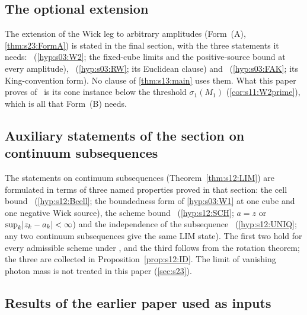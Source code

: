 \subsection{The optional extension}

The extension of the Wick leg to arbitrary amplitudes (Form~(A), \cref{thm:s23:FormA}) is stated in the final section, with the three statements it needs: \Wtwo\ (\cref{hyp:s03:W2}; the fixed-cube limits and the positive-source bound at every amplitude), \RW\ (\cref{hyp:s03:RW}; its Euclidean clause) and \FAK\ (\cref{hyp:s03:FAK}; its King-convention form). No clause of \cref{thm:s13:main} uses them. What this paper proves of \Wtwo\ is its cone instance below the threshold $\sigma_1(M_1)$ (\cref{cor:s11:W2prime}), which is all that Form~(B) needs.

\subsection{Auxiliary statements of the section on continuum subsequences}

The statements on continuum subsequences (Theorem~\ref{thm:s12:LIM}) are formulated in terms of three named properties proved in that section: the cell bound \Bcell\ (\cref{hyp:s12:Bcell}; the boundedness form of \cref{hyp:s03:W1} at one cube and one negative Wick source), the scheme bound \SCH\ (\cref{hyp:s12:SCH}; $a=z$ or $\sup_k\lvert z_k-a_k\rvert<\infty$) and the independence of the subsequence \UNIQ\ (\cref{hyp:s12:UNIQ}; any two continuum subsequences give the same LIM state). The first two hold for every admissible scheme under \Tthree, and the third follows from the rotation theorem; the three are collected in Proposition~\ref{prop:s12:ID}. The limit of vanishing photon mass is not treated in this paper (\cref{sec:s23}).

\subsection{Results of the earlier paper used as inputs}


